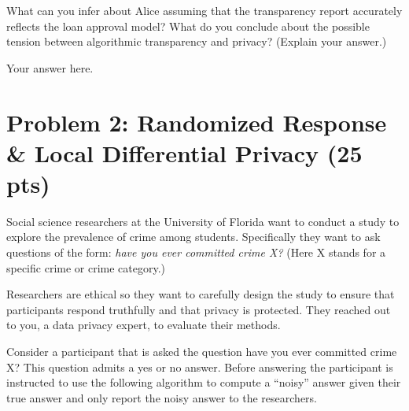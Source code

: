 \documentclass[11pt,letterpaper]{article}
\newenvironment{answer}{\em \color{blue} \begin{adjustwidth}{1cm}{1cm}}{\end{adjustwidth}}
\begin{document}
\begin{enumerate}
	What can you infer about Alice assuming that the transparency report accurately reflects the loan approval model? What do you conclude about the possible tension between algorithmic transparency and privacy? (Explain your answer.)
	
	\begin{answer}
	
		Your answer here.
		
	\end{answer}

	
\end{enumerate}

\newpage
\section*{Problem 2: Randomized Response \& Local Differential Privacy (25 pts)}
%

Social science researchers at the University of Florida want to conduct a study to explore the prevalence of crime among students. Specifically they want to ask questions of the form: {\em have you ever committed crime X?} (Here X stands for a specific crime or crime category.) 

Researchers are ethical so they want to carefully design the study to ensure that participants respond truthfully and that privacy is protected. They reached out to you, a data privacy expert, to evaluate their methods.

Consider a participant that is asked the question {have you ever committed crime X?} This question admits a yes or no answer. Before answering the participant is instructed to use the following algorithm to compute a ``noisy'' answer given their true answer and only report the noisy answer to the researchers.

\medskip
%
\end{document}
